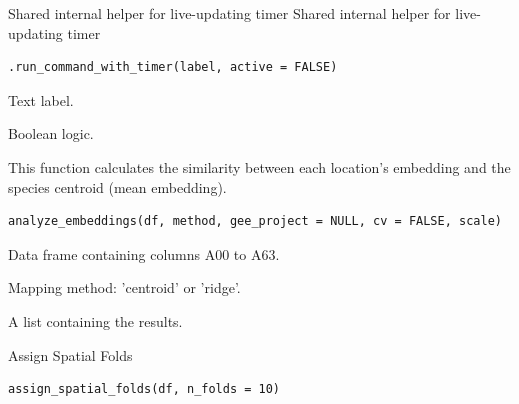 \documentclass[letterpaper]{book}
\begin{document}
%
\begin{Description}
Shared internal helper for live-updating timer
Shared internal helper for live-updating timer
\end{Description}
%
\begin{Usage}
\begin{verbatim}
.run_command_with_timer(label, active = FALSE)
\end{verbatim}
\end{Usage}
%
\begin{Arguments}
\begin{ldescription}
\item[\code{label}] Text label.

\item[\code{active}] Boolean logic.
\end{ldescription}
\end{Arguments}
%
\begin{Description}
This function calculates the similarity between each location's embedding and the species centroid (mean embedding).
\end{Description}
%
\begin{Usage}
\begin{verbatim}
analyze_embeddings(df, method, gee_project = NULL, cv = FALSE, scale)
\end{verbatim}
\end{Usage}
%
\begin{Arguments}
\begin{ldescription}
\item[\code{df}] Data frame containing columns A00 to A63.

\item[\code{method}] Mapping method: 'centroid' or 'ridge'.
\end{ldescription}
\end{Arguments}
%
\begin{Value}
A list containing the results.
\end{Value}
%
\begin{Description}
Assign Spatial Folds
\end{Description}
%
\begin{Usage}
\begin{verbatim}
assign_spatial_folds(df, n_folds = 10)
\end{verbatim}
\end{Usage}
\end{document}
